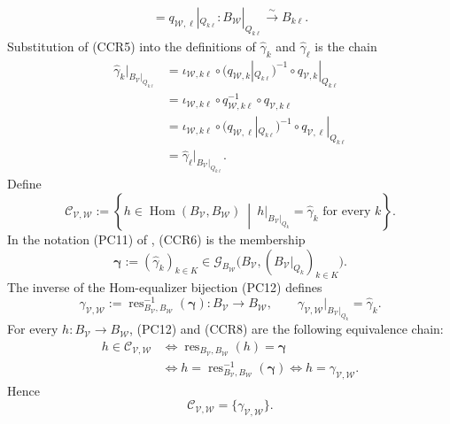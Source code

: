 \begin{definition}
\[\begin{gathered}
      =q_{\mathcal W,\ell}|_{Q_{k\ell}}
      \colon B_{\mathcal W}|_{Q_{k\ell}}\xrightarrow{\sim}B_{k\ell}.
  \end{gathered}                                                    \tag{CCR5}
  \]
  Substitution of (CCR5) into the definitions of
  $\widehat\gamma_k$ and $\widehat\gamma_\ell$ is the chain
  \[
  \begin{aligned}
    \widehat\gamma_k|_{B_{\mathcal V}|_{Q_{k\ell}}}
      &=\iota_{\mathcal W,k\ell}\circ
        (q_{\mathcal W,k}|_{Q_{k\ell}})^{-1}\circ
        q_{\mathcal V,k}|_{Q_{k\ell}}\\
      &=\iota_{\mathcal W,k\ell}\circ
        q_{\mathcal W,k\ell}^{-1}\circ q_{\mathcal V,k\ell}\\
      &=\iota_{\mathcal W,k\ell}\circ
        (q_{\mathcal W,\ell}|_{Q_{k\ell}})^{-1}\circ
        q_{\mathcal V,\ell}|_{Q_{k\ell}}\\
      &=\widehat\gamma_\ell|_{B_{\mathcal V}|_{Q_{k\ell}}}.
  \end{aligned}                                                     \tag{CCR6}
  \]
  Define
  \[
    \mathscr C_{\mathcal V,\mathcal W}:=
      \left\{h\in\operatorname{Hom}(B_{\mathcal V},B_{\mathcal W})
        \ \middle|\
        h|_{B_{\mathcal V}|_{Q_k}}=\widehat\gamma_k
        \text{ for every }k\right\}.
  \]
  In the notation (PC11) of
  , (CCR6) is the membership
  \[
    \boldsymbol\gamma:=(\widehat\gamma_k)_{k\in K}
      \in\mathscr G_{B_{\mathcal W}}
        \bigl(B_{\mathcal V},(B_{\mathcal V}|_{Q_k})_{k\in K}\bigr).
                                                                    \tag{CCR7}
  \]
  The inverse of the Hom-equalizer bijection (PC12) defines
  \[
    \gamma_{\mathcal V,\mathcal W}:=
      \operatorname{res}_{B_{\mathcal V},B_{\mathcal W}}^{-1}
        (\boldsymbol\gamma)
      \colon B_{\mathcal V}\longrightarrow B_{\mathcal W},
    \qquad
    \gamma_{\mathcal V,\mathcal W}|_{B_{\mathcal V}|_{Q_k}}
      =\widehat\gamma_k.                                          \tag{CCR8}
  \]
  For every $h\colon B_{\mathcal V}\to B_{\mathcal W}$, (PC12) and
  (CCR8) are the following equivalence chain:
  \[
  \begin{aligned}
    h\in\mathscr C_{\mathcal V,\mathcal W}
      &\Longleftrightarrow
        \operatorname{res}_{B_{\mathcal V},B_{\mathcal W}}(h)
          =\boldsymbol\gamma\\
      &\Longleftrightarrow
        h=\operatorname{res}_{B_{\mathcal V},B_{\mathcal W}}^{-1}
          (\boldsymbol\gamma)
       \Longleftrightarrow h=\gamma_{\mathcal V,\mathcal W}.
  \end{aligned}
  \]
  Hence
  \[
    \mathscr C_{\mathcal V,\mathcal W}
      =\{\gamma_{\mathcal V,\mathcal W}\}.                       \tag{CCR9}
  \]
\end{definition}

